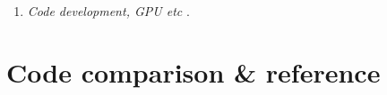 \documentclass[12pt]{article}
\begin{document}
\begin{enumerate}
\begin{enumerate}
\item
{\em Code development, GPU etc} \citep{
2023RNAAS...7...69L,%
2021JOSS....6.2807P,%
2022ParC..11102904P,%
2017CoPhC.217...11P%
}.

\end{enumerate}
\end{enumerate}

\section{Code comparison \& reference}
\end{document}
